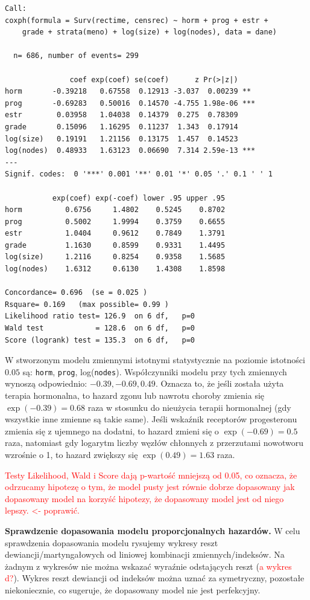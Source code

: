 \documentclass[]{article}
\begin{document}
\begin{verbatim}
Call:
coxph(formula = Surv(rectime, censrec) ~ horm + prog + estr + 
    grade + strata(meno) + log(size) + log(nodes), data = dane)

  n= 686, number of events= 299 

               coef exp(coef) se(coef)      z Pr(>|z|)    
horm       -0.39218   0.67558  0.12913 -3.037  0.00239 ** 
prog       -0.69283   0.50016  0.14570 -4.755 1.98e-06 ***
estr        0.03958   1.04038  0.14379  0.275  0.78309    
grade       0.15096   1.16295  0.11237  1.343  0.17914    
log(size)   0.19191   1.21156  0.13175  1.457  0.14523    
log(nodes)  0.48933   1.63123  0.06690  7.314 2.59e-13 ***
---
Signif. codes:  0 '***' 0.001 '**' 0.01 '*' 0.05 '.' 0.1 ' ' 1

           exp(coef) exp(-coef) lower .95 upper .95
horm          0.6756     1.4802    0.5245    0.8702
prog          0.5002     1.9994    0.3759    0.6655
estr          1.0404     0.9612    0.7849    1.3791
grade         1.1630     0.8599    0.9331    1.4495
log(size)     1.2116     0.8254    0.9358    1.5685
log(nodes)    1.6312     0.6130    1.4308    1.8598

Concordance= 0.696  (se = 0.025 )
Rsquare= 0.169   (max possible= 0.99 )
Likelihood ratio test= 126.9  on 6 df,   p=0
Wald test            = 128.6  on 6 df,   p=0
Score (logrank) test = 135.3  on 6 df,   p=0
\end{verbatim}

W stworzonym modelu zmiennymi istotnymi statystycznie na poziomie
istotności \(0.05\) są: \texttt{horm}, \texttt{prog},
log(\texttt{nodes}). Współczynniki modelu przy tych zmiennych wynoszą
odpowiednio: \(-0.39, -0.69, 0.49\). Oznacza to, że jeśli została użyta
terapia hormonalna, to hazard zgonu lub nawrotu choroby zmienia się
\(\exp(-0.39)=0.68\) raza w stosunku do nieużycia terapii hormonalnej
(gdy wszystkie inne zmienne są takie same). Jeśli wskaźnik receptorów
progesteronu zmienia się z ujemnego na dodatni, to hazard zmieni się o
\(\exp(-0.69)=0.5\) raza, natomiast gdy logarytm liczby węzłów chłonnych
z przerzutami nowotworu wzrośnie o 1, to hazard zwiększy się
\(\exp(0.49)=1.63\) raza.

\textcolor{red}{Testy Likelihood, Wald i Score dają p-wartość mniejszą od 0.05, co oznacza, że odrzucamy hipotezę o tym, że model pusty jest równie dobrze dopasowany jak dopasowany model na korzyść hipotezy, że dopasowany model jest od niego lepszy. <- poprawić.}

\newpage
\textbf{Sprawdzenie dopasowania modelu proporcjonalnych hazardów.}
\newline
W celu sprawdzenia dopasowania modelu rysujemy wykresy reszt
dewiancji/martyngałowych od liniowej kombinacji zmiennych/indeksów. Na
żadnym z wykresów nie można wskazać wyraźnie odstających reszt
(\textcolor{red}{a wykres d?}). Wykres reszt dewiancji od indeksów można
uznać za symetryczny, pozostałe niekoniecznie, co sugeruje, że
dopasowany model nie jest perfekcyjny.
\end{document}
